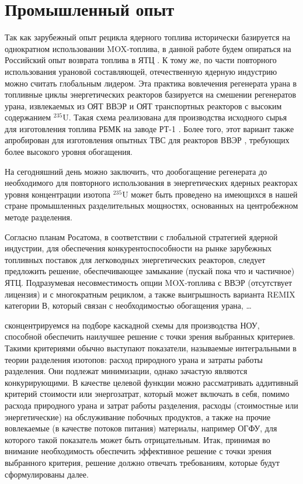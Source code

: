 \section{Промышленный опыт}\label{sec:ch1/sec1}
Так как зарубежный опыт рецикла ядерного топлива исторически базируется на однократном использовании MOX-топлива, в данной работе будем опираться на Российский опыт возврата топлива в ЯТЦ \cite{international2003iaea}. К тому же, по части повторного использования урановой составляющей, отечественную ядерную индустрию можно считать глобальным лидером.  Эта практика вовлечения регенерата урана в топливные циклы энергетических реакторов базируется на смешении регенератов урана, извлекаемых из ОЯТ ВВЭР и ОЯТ транспортных реакторов с высоким содержанием $^{235}$U. Такая схема реализована для производства исходного сырья для изготовления топлива РБМК на заводе РТ-1 \cite{volkVozvratUranaIz2010}. Более того, этот вариант также апробирован для изготовления опытных ТВС для реакторов ВВЭР \cite{proselkovAnalizVozmozhnostiIspolzovaniya2003}, требующих более высокого уровня обогащения.

На сегодняшний день можно заключить, что дообогащение регенерата до необходимого для повторного использования в энергетических ядерных реакторах уровня концентрации изотопа $^{235}$U может быть проведено на имеющихся в нашей стране промышленных разделительных мощностях, основанных на центробежном методе разделения. 

Согласно планам Росатома, в соответствии с глобальной стратегией ядерной индустрии, для обеспечения конкурентоспособности на рынке зарубежных топливных поставок для легководных энергетических реакторов, следует предложить решение, обеспечивающее замыкание (пускай пока что и частичное) ЯТЦ. Подразумевая несовместимость опции MOX-топлива с ВВЭР (отсутствует лицензия) и с многократным рециклом, а также выигрышность варианта REMIX категории В, который связан с необходимостью обогащения урана, \dots

сконцентрируемся на подборе каскадной схемы для производства НОУ, способной обеспечить наилучшее решение с точки зрения выбранных критериев. Такими критериями  обычно выступают показатели, называемые интегральными в теории разделения изотопов: расход природного урана и затраты работы разделения. Они подлежат минимизации, однако зачастую являются конкурирующими. В качестве целевой функции можно рассматривать аддитивный критерий стоимости или энергозатрат, который может включать в себя, помимо расхода природного урана и затрат работы разделения, расходы (стоимостные или энергетические) на обслуживание побочных продуктов, а также на прочие вовлекаемые (в качестве потоков питания) материалы, например ОГФУ, для которого такой показатель может быть отрицательным.
Итак, принимая во внимание необходимость обеспечить эффективное решение с точки зрения выбранного критерия, решение должно отвечать требованиям, которые будут сформулированы далее.

